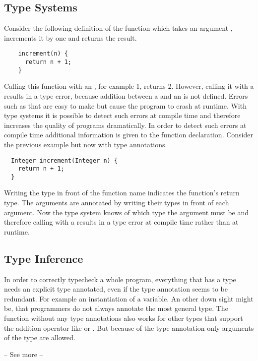 \subsection{Type Systems}
Consider the following definition of the function  which takes an argument ,
increments it by one and returns the result.
\begin{verbatim}
    increment(n) {
      return n + 1;
    }
\end{verbatim}
Calling this function with an , for example 1, returns 2.
However, calling it with a  results in a type error, because addition between a 
and an  is not defined.
Errors such as that are easy to make but cause the program to crash at runtime.
With type systems it is possible to detect such errors at compile time and therefore increases the quality of programs dramatically.
In order to detect such errors at compile time additional information is given to the function declaration.
Consider the previous example but now with type annotations.
\begin{verbatim}
  Integer increment(Integer n) {
    return n + 1;
  }
\end{verbatim}
Writing the type  in front of the function name indicates the function's return type.
The arguments are annotated by writing their types in front of each argument.
Now the type system knows of which type the argument must be and therefore calling  with a  results in a type error at compile time rather than at runtime.

\subsection{Type Inference}
In order to correctly typecheck a whole program, everything that has a type needs an explicit type annotated,
even if the type annotation seems to be redundant. For example an instantiation of a variable.
An other down sight might be, that programmers do not always annotate the most general type. The  function without any type annotations also works for other types that support the addition operator like  or .
But because of the type annotation only arguments of the type  are allowed.

-- See more --

